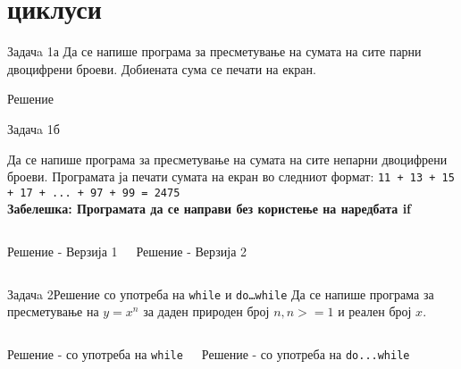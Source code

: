 

\section{циклуси}
\begin{frame}[fragile]{Задачa 1а}
Да се напише програма за пресметување на сумата на сите парни двоцифрени броеви.
Добиената сума се печати на екран.
\pause
\begin{exampleblock}{Решение}

\end{exampleblock}
\end{frame}


\begin{frame}[fragile]{Задачa 1б}
\begin{scriptsize}
Да се напише програма за пресметување на сумата на сите непарни двоцифрени
броеви. Програмата ја печати сумата на екран во следниот формат: \texttt{11 + 13
+ 15 + 17 + ... + 97 + 99 = 2475}\\
\textbf{Забелешка: Програмата да се направи без користење на наредбата if}
\end{scriptsize}
\pause
\begin{columns}
\begin{exampleblock}{Решение - Верзија 1}

\end{exampleblock}
\pause
{}
\begin{exampleblock}{Решение - Верзија 2}

\end{exampleblock}
\end{columns}
\end{frame}

\begin{frame}[fragile]{Задачa 2}{Решение со употреба на \texttt{while} и
\texttt{do\ldots while}} Да се напише програма за пресметување на $y = x^n$ за
даден природен број $n, n>=1$ и реален број $x$.
\pause
\begin{columns}
\begin{exampleblock}{Решение - со употреба на \texttt{while}}

\end{exampleblock}
\pause
{}
\begin{exampleblock}{Решение - со употреба на \texttt{do...while}}

\end{exampleblock}
\end{columns}
\end{frame}

